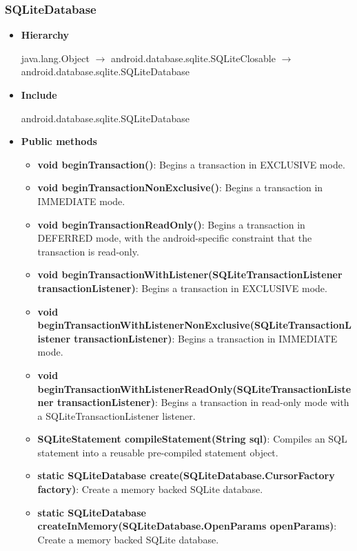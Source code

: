 \documentclass{report}
\begin{document}
\begin{itemize}
    \subsubsection{SQLiteDatabase}
    \begin{itemize}
        \item \textbf{Hierarchy}
            \begin{center}
                java.lang.Object $\to $	android.database.sqlite.SQLiteClosable $\to $	android.database.sqlite.SQLiteDatabase
            \end{center}
        \item \textbf{Include}
            \bigbreak \noindent 
            \begin{javacode}
                android.database.sqlite.SQLiteDatabase
            \end{javacode}
        \item \textbf{Public methods}
            \begin{itemize}
                \item \textbf{void	beginTransaction()}: Begins a transaction in EXCLUSIVE mode.
                \item \textbf{void	beginTransactionNonExclusive()}: Begins a transaction in IMMEDIATE mode.
                \item \textbf{void	beginTransactionReadOnly()}: Begins a transaction in DEFERRED mode, with the android-specific constraint that the transaction is read-only.
                \item \textbf{void	beginTransactionWithListener(SQLiteTransactionListener transactionListener)}: Begins a transaction in EXCLUSIVE mode.
                \item \textbf{void	beginTransactionWithListenerNonExclusive(SQLiteTransactionListener transactionListener)}: Begins a transaction in IMMEDIATE mode.
                \item \textbf{void	beginTransactionWithListenerReadOnly(SQLiteTransactionListener transactionListener)}: Begins a transaction in read-only mode with a SQLiteTransactionListener listener.
                \item \textbf{SQLiteStatement	compileStatement(String sql)}: Compiles an SQL statement into a reusable pre-compiled statement object.
                \item \textbf{static SQLiteDatabase	create(SQLiteDatabase.CursorFactory factory)}: Create a memory backed SQLite database.
                \item \textbf{static SQLiteDatabase	createInMemory(SQLiteDatabase.OpenParams openParams)}: Create a memory backed SQLite database.

\end{itemize}
\end{itemize}
\end{itemize}
\end{document}
